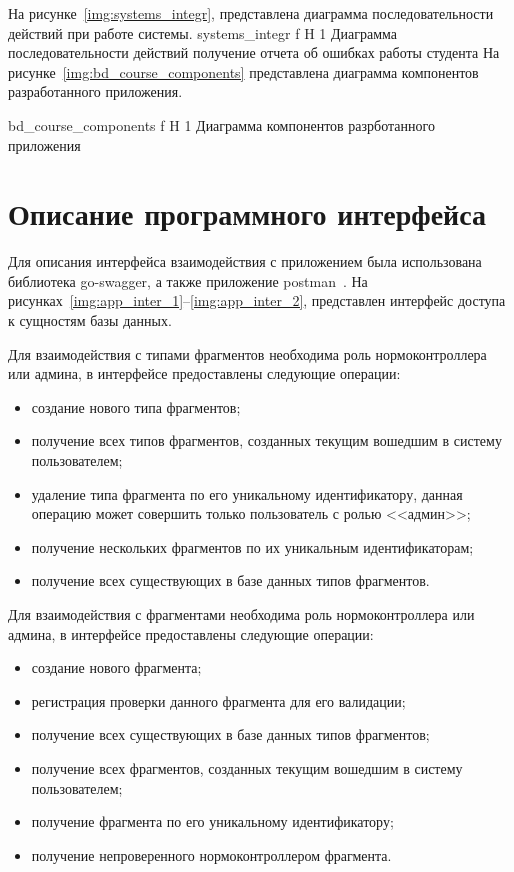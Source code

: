 На рисунке~\ref{img:systems_integr}, представлена диаграмма последовательности
действий при работе системы.
{systems_integr} %
{f} %
{H} %
{1\textwidth} %
{Диаграмма последовательности действий получение отчета об ошибках работы
	студента} %
На рисунке~\ref{img:bd_course_components} представлена диаграмма компонентов разработанного приложения.

{bd_course_components} %
{f} %
{H} %
{1\textwidth} %
{Диаграмма компонентов разрботанного приложения} %






\section{Описание программного интерфейса}
Для описания интерфейса взаимодействия с приложением была использована
библиотека go-swagger, а также приложение postman~\cite{go-swagger,postman}. На
рисунках~\ref{img:app_inter_1}--\ref{img:app_inter_2}, представлен интерфейс
доступа к сущностям базы данных.

Для взаимодействия с типами фрагментов необходима роль нормоконтроллера или
админа, в интерфейсе предоставлены следующие операции:
\begin{itemize}
	\item создание нового типа фрагментов;
	\item получение всех типов фрагментов, созданных текущим вошедшим в систему
	пользователем;
	\item удаление типа фрагмента по его уникальному идентификатору, данная
	операцию может совершить только пользователь с ролью <<админ>>;
	\item получение нескольких фрагментов по их уникальным идентификаторам;
	\item получение всех существующих в базе данных типов фрагментов.
\end{itemize}

Для взаимодействия с фрагментами необходима роль нормоконтроллера или админа, в
интерфейсе предоставлены следующие операции:
\begin{itemize}
	\item создание нового фрагмента;
	\item регистрация проверки данного фрагмента для его валидации;
	\item получение всех существующих в базе данных типов фрагментов;
	\item получение всех фрагментов, созданных текущим вошедшим в систему
	пользователем;
	\item получение фрагмента по его уникальному идентификатору;
	\item получение непроверенного нормоконтроллером фрагмента.
\end{itemize}

